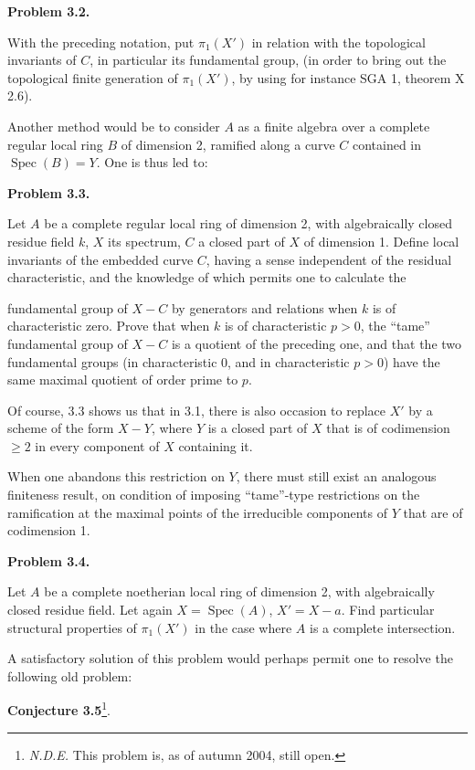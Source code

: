 \documentclass[
  11pt,
  a4paper,
]{book}
\begin{document}
\textbf{Problem 3.2.}

With the preceding notation, put \(\pi_{1}(X')\) in relation with the
topological invariants of \(C\), in particular its fundamental group,
(in order to bring out the topological finite generation of
\(\pi_{1}(X')\), by using for instance SGA 1, theorem X 2.6).

Another method would be to consider \(A\) as a finite algebra over a
complete regular local ring \(B\) of dimension 2, ramified along a curve
\(C\) contained in \(\operatorname{Spec}(B) = Y\). One is thus led to:

\textbf{Problem 3.3.}

Let \(A\) be a complete regular local ring of dimension 2, with
algebraically closed residue field \(k\), \(X\) its spectrum, \(C\) a
closed part of \(X\) of dimension 1. Define local invariants of the
embedded curve \(C\), having a sense independent of the residual
characteristic, and the knowledge of which permits one to calculate the

fundamental group of \(X - C\) by generators and relations when \(k\) is
of characteristic zero. Prove that when \(k\) is of characteristic
\(p > 0\), the ``tame'' fundamental group of \(X - C\) is a quotient of
the preceding one, and that the two fundamental groups (in
characteristic 0, and in characteristic \(p > 0\)) have the same maximal
quotient of order prime to \(p\).

Of course, 3.3 shows us that in 3.1, there is also occasion to replace
\(X'\) by a scheme of the form \(X - Y\), where \(Y\) is a closed part
of \(X\) that is of codimension \(\geqslant 2\) in every component of
\(X\) containing it.

When one abandons this restriction on \(Y\), there must still exist an
analogous finiteness result, on condition of imposing ``tame''-type
restrictions on the ramification at the maximal points of the
irreducible components of \(Y\) that are of codimension 1.

\textbf{Problem 3.4.}

Let \(A\) be a complete noetherian local ring of dimension 2, with
algebraically closed residue field. Let again \(X =
\operatorname{Spec}(A)\), \(X' = X - {a}\). Find particular structural
properties of \(\pi_{1}(X')\) in the case where \(A\) is a complete
intersection.

A satisfactory solution of this problem would perhaps permit one to
resolve the following old problem:

\textbf{Conjecture 3.5}\footnote{\emph{N.D.E.} This problem is, as of
  autumn 2004, still open.}.
\end{document}
